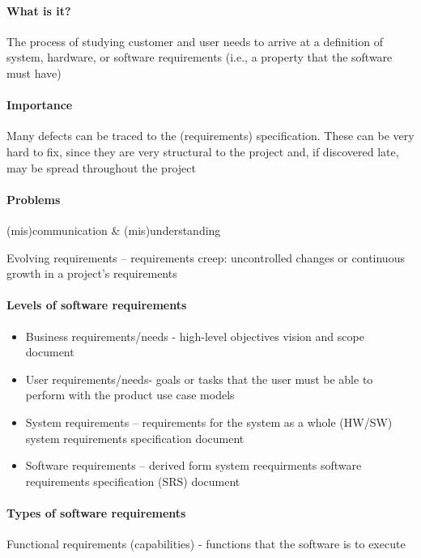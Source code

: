 \documentclass[../ESOF_notes.tex]{subfiles}
\begin{document}
 

\paragraph{What is it?}

The process of studying customer and user needs to arrive at a definition of system, hardware, or software requirements (i.e., a property that the software must have)

\paragraph{Importance} 
Many defects can be traced to the (requirements) specification. These can be very hard to fix, since they are very structural to the project and, if discovered late, may be spread throughout the project

\paragraph{Problems}

(mis)communication \& (mis)understanding

Evolving requirements – requirements creep: uncontrolled changes or continuous growth in a project’s requirements

\paragraph{Levels of software requirements}
\begin{itemize}
    \item Business requirements/needs - high-level objectives
    vision and scope document
    \item User requirements/needs- goals or tasks that the user must be able to perform with the product
    use case models
    \item System requirements – requirements for the system as a whole (HW/SW)
    system requirements specification document
    \item Software requirements – derived form system reequirments
    software requirements specification (SRS) document
\end{itemize}

\paragraph{Types of software requirements}
Functional requirements (capabilities) - functions that the software is to execute
\end{document}
